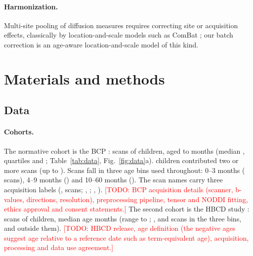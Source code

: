 \documentclass[11pt]{article}
\newcommand{\todo}[1]{\textcolor{red}{[TODO: #1]}}
\begin{document}
\paragraph{Harmonization.} Multi-site pooling of diffusion measures requires correcting site or acquisition effects,
classically by location-and-scale models such as ComBat \citep{johnson2007combat,fortin2017dti}; our batch correction
is an age-aware location-and-scale model of this kind.

\section{Materials and methods}

\subsection{Data}\label{sec:data}

\paragraph{Cohorts.} The normative cohort is the BCP \citep{howell2019bcp}: \bcpscans{} scans of \bcpsubjects{}
children, aged \bcpagemin{} to \bcpagemax{} months (median \bcpagemedian{}, quartiles \bcpageQOne{} and
\bcpageQThree{}; Table~\ref{tab:data}, Fig.~\ref{fig:data}a). \bcpsubjTwoPlus{} children contributed two or more scans
(up to \bcpsessmax{}). Scans fall in three age bins used throughout: 0--3 months (\bcpbinA{} scans), 4--9 months
(\bcpbinB{}) and 10--60 months (\bcpbinC{}). The scan names carry three acquisition labels
(\texttt{\bcpAcqAName}, \bcpAcqAN{} scans; \texttt{\bcpAcqBName}, \bcpAcqBN{}; \texttt{\bcpAcqCName}, \bcpAcqCN{}).
\todo{BCP acquisition details (scanner, b-values, directions, resolution), preprocessing pipeline, tensor and NODDI
fitting, ethics approval and consent statements.} The second cohort is the HBCD study
\citep{volkow2021hbcd,dean2024hbcdmri}: \hbcdscans{} scans of \hbcdsubjects{} children, median age \hbcdagemedian{}
months (range \hbcdagemin{} to \hbcdagemax{}; \hbcdbinA{}, \hbcdbinB{} and \hbcdbinC{} scans in the three bins, and
\hbcdbinnone{} outside them). \todo{HBCD release, age definition (the negative ages suggest age relative to a reference
date such as term-equivalent age), acquisition, processing and data use agreement.}
\end{document}
